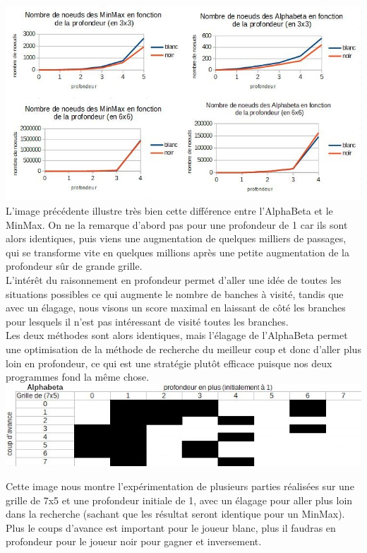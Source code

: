 \documentclass[a4paper, 11pt]{article}
\begin{document}
\includegraphics[scale=0.5]{images/illu1.png}\\

L'image précédente illustre très bien cette différence entre l'AlphaBeta et le MinMax. On ne la remarque d'abord pas pour une profondeur de 1 car ils sont alors identiques, puis viens une augmentation de quelques milliers de passages, qui se transforme vite en quelques millions après une petite augmentation de la profondeur sûr de grande grille.\\

L'intérêt du raisonnement en profondeur permet d'aller une idée de toutes les situations possibles ce qui augmente le nombre de banches à visité, tandis que avec un élagage, nous visons un score maximal en laissant de côté les branches pour lesquels il n'est pas intéressant de visité toutes les branches.\\

Les deux méthodes sont alors identiques, mais l'élagage de l'AlphaBeta permet une optimisation de la méthode de recherche du meilleur coup et donc d'aller plus loin en profondeur, ce qui est une stratégie plutôt efficace puisque nos deux programmes fond la même chose.\\

\includegraphics[scale=0.5]{images/illu2.png}\\
\newline

Cette image nous montre l'expérimentation de plusieurs parties réalisées sur une grille de 7x5 et une profondeur initiale de 1, avec un élagage pour aller plus loin dans la recherche (sachant que les résultat seront identique pour un MinMax). Plus le coups d'avance est important pour le joueur blanc, plus il faudras en profondeur pour le joueur noir pour gagner et inversement.\\
\end{document}
